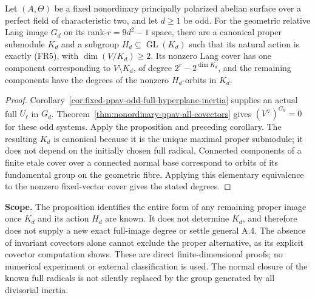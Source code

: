 \begin{corollary}
\label{cor:root-odd-image-parabolic-alternative}
Let \((A,\Theta)\) be a fixed nonordinary principally polarized
abelian surface over a perfect field of characteristic two, and
let \(d\geq1\) be odd. For the geometric relative Lang image
\(G_d\) on its rank-\(r=9d^2-1\) space, there are a canonical
proper submodule \(K_d\) and a subgroup
\(H_d\subseteq\operatorname{GL}(K_d)\) such that its natural
action is exactly (FR5), with \(\dim(V/K_d)\geq2\).
Its nonzero Lang cover has one component corresponding to
\(V\setminus K_d\), of degree \(2^r-2^{\dim K_d}\), and
the remaining components have the degrees of the nonzero
\(H_d\)-orbits in \(K_d\).
\end{corollary}
\begin{proof}
Corollary~\ref{cor:fixed-ppav-odd-full-hyperplane-inertia}
supplies an actual full \(U_\ell\) in \(G_d\).
Theorem~\ref{thm:nonordinary-ppav-all-covectors} gives
\((V^\vee)^{G_d}=0\) for these odd systems. Apply the
proposition and preceding corollary. The resulting \(K_d\)
is canonical because it is the unique maximal proper
submodule; it does not depend on the initially chosen full
radical. Connected components of a finite etale cover over
a connected normal base correspond to orbits of its
fundamental group on the geometric fibre. Applying this
elementary equivalence to the nonzero fixed-vector cover
gives the stated degrees.
\end{proof}

\par\smallskip\noindent\textbf{Scope.}
The proposition identifies the entire form of any remaining
proper image once \(K_d\) and its action \(H_d\) are known.
It does not determine \(K_d\), and therefore does not supply
a new exact full-image degree or settle general A.4.
The absence of invariant covectors alone cannot exclude the
proper alternative, as its explicit covector computation shows.
These are direct finite-dimensional proofs; no numerical
experiment or external classification is used. The normal
closure of the known full radicals is not silently replaced
by the group generated by all divisorial inertia.
